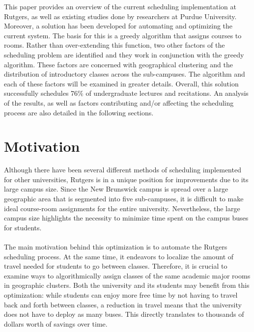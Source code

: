 \documentclass{acm_proc_article-sp}
\begin{document}
	This paper provides an overview of the current scheduling implementation at
	Rutgers, as well as existing studies done by researchers at Purdue University.
	Moreover, a solution has been developed for automating and optimizing the
	current system. The basis for this is a greedy algorithm that assigns courses
	to rooms. Rather than over-extending this function, two other factors of the
	scheduling problem are identified and they work in conjunction with the greedy
	algorithm. These factors are concerned with geographical clustering and the
	distribution of introductory classes across the sub-campuses. The algorithm and
	each of these factors will be examined in greater details. Overall, this
	solution successfully schedules 76\% of undergraduate lectures and recitations.
	An analysis of the results, as well as factors contributing and/or affecting
	the scheduling process are also detailed in the following sections.

\section{Motivation}
	Although there have been several different methods of scheduling implemented
	for other universities, Rutgers is in a unique position for improvements due to
	its large campus size. Since the New Brunswick campus is spread over a large
	geographic area that is segmented into five sub-campuses, it is difficult to
	make ideal course-room assignments for the entire university. Nevertheless,
	the large campus size highlights the necessity to minimize time spent on the
	campus buses for students. 
	\\\\
	The main motivation behind this optimization is to automate the Rutgers
	scheduling process. At the same time, it endeavors to localize the amount of
	travel needed for students to go between classes. Therefore, it is crucial to
	examine ways to algorithmically assign classes of the same academic major rooms
	in geographic clusters. Both the university and its students may benefit from
	this optimization: while students can enjoy more free time by not having to
	travel back and forth between classes, a reduction in travel means that the
	university does not have to deploy as many buses. This directly translates to
	thousands of dollars worth of savings over time. 
\end{document}
